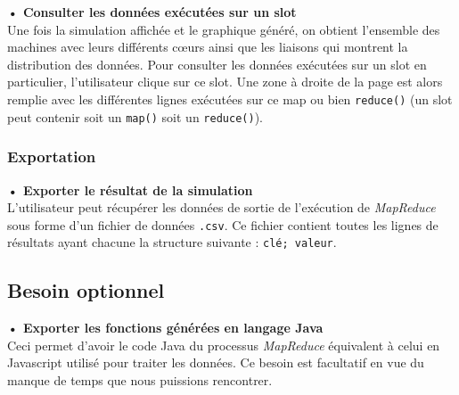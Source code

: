 \textbf{• Consulter les données exécutées sur un slot\\} Une fois la simulation affichée et le graphique généré, on obtient l'ensemble des machines avec leurs différents cœurs ainsi que les liaisons qui montrent la distribution des données. Pour consulter les données exécutées sur un slot en particulier, l'utilisateur clique sur ce slot. Une zone à droite de la page est alors remplie avec les différentes lignes exécutées sur ce map ou bien {\tt reduce()} (un slot peut contenir soit un {\tt map()} soit un {\tt reduce()}).\\ 
 
\subsubsection{Exportation}

\textbf{• Exporter le résultat de la simulation\\} L'utilisateur peut récupérer les données de sortie de l'exécution de {\it MapReduce} sous forme d'un fichier de données {\tt .csv}. Ce fichier contient toutes les lignes de résultats ayant chacune la structure suivante : {\tt clé; valeur}.


\subsection{Besoin optionnel}

\textbf{• Exporter les fonctions générées en langage Java\\} Ceci permet d'avoir le code Java du processus {\it MapReduce} équivalent à celui en Javascript utilisé pour traiter les données. Ce besoin est facultatif en vue du manque de temps que nous puissions rencontrer.

